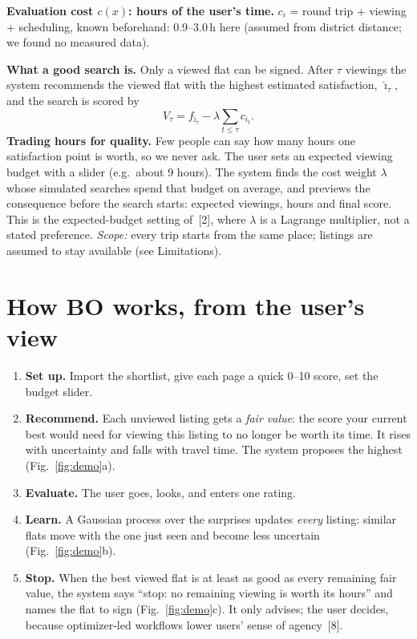 \documentclass[10pt,a4paper,twocolumn]{article}
\newcommand{\lead}[1]{\textbf{#1}}
\begin{document}
\lead{Evaluation cost $c(x)$: hours of the user's time.} $c_i$ = round trip + viewing + scheduling, known
beforehand: 0.9--3.0\,h here (assumed from district distance; we found no measured data).

\lead{What a good search is.} Only a viewed flat can be signed. After $\tau$ viewings the system recommends
the viewed flat with the highest estimated satisfaction, $\hat\imath_\tau$, and the search is scored by
\[ V_\tau=f_{\hat\imath_\tau}-\lambda\textstyle\sum_{t\le\tau}c_{i_t}. \]
\lead{Trading hours for quality.} Few people can say how many hours one satisfaction point is worth, so we
never ask. The user sets an expected viewing budget with a slider (e.g.\ about 9 hours). The system finds the
cost weight $\lambda$ whose simulated searches spend that budget on average, and previews the consequence
before the search starts: expected viewings, hours and final score. This is the expected-budget setting
of~[2], where $\lambda$ is a Lagrange multiplier, not a stated preference.
\emph{Scope:} every trip starts from the same place; listings are assumed to stay available (see
Limitations).

\section{How BO works, from the user's view}
\begin{enumerate}
\item \lead{Set up.} Import the shortlist, give each page a quick 0--10 score, set the budget slider.
\item \lead{Recommend.} Each unviewed listing gets a \emph{fair value}: the score your current best would need
for viewing this listing to no longer be worth its time. It rises with uncertainty and falls with travel
time. The system proposes the highest (Fig.~\ref{fig:demo}a).
\item \lead{Evaluate.} The user goes, looks, and enters one rating.
\item \lead{Learn.} A Gaussian process over the surprises updates \emph{every} listing: similar flats move with
the one just seen and become less uncertain (Fig.~\ref{fig:demo}b).
\item \lead{Stop.} When the best viewed flat is at least as good as every remaining fair value, the system says
``stop: no remaining viewing is worth its hours'' and names the flat to sign (Fig.~\ref{fig:demo}c). It only
advises; the user decides, because optimizer-led workflows lower users' sense of agency~[8].
\end{enumerate}
\end{document}
